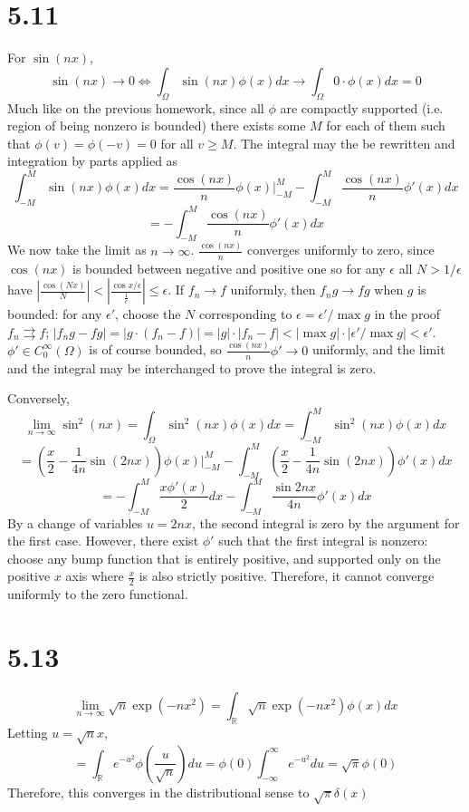 \documentclass{article}
\begin{document}
\section*{5.11}
For $\sin(nx)$,
\[\sin(nx)\to 0\Leftrightarrow\int_\Omega\sin(nx)\phi(x)dx\to \int_\Omega0\cdot\phi(x)dx=0\]
Much like on the previous homework, since all $\phi$ are compactly supported (i.e. region of being nonzero is bounded) there exists some $M$ for each of them such that $\phi(v)=\phi(-v)=0$ for all $v\geq M$. The integral may the be rewritten and integration by parts applied as
\[\int_{-M}^M\sin(nx)\phi(x)dx=\frac{\cos(nx)}{n}\phi(x)\bigg|_{-M}^M-\int_{-M}^M\frac{\cos(nx)}{n}\phi'(x)dx\]
\[=-\int_{-M}^M\frac{\cos(nx)}{n}\phi'(x)dx\]
We now take the limit as $n\to\infty$. $\frac{\cos(nx)}{n}$ converges uniformly to zero, since $\cos(nx)$ is bounded between negative and positive one so for any $\epsilon$ all $N> 1/\epsilon$ have $|\frac{\cos(Nx)}{N}|<|\frac{\cos{x/\epsilon}}{\frac{1}{\epsilon}}| \leq \epsilon$. If $f_n\to f$ uniformly, then $f_ng\to fg$ when $g$ is bounded: for any $\epsilon'$, choose the $N$ corresponding to $\epsilon= \epsilon' / \max{g}$ in the proof $f_n\rightrightarrows f$; $|f_ng-fg| =|g\cdot(f_n-f)| =|g|\cdot|f_n-f|< |\max{g}|\cdot|\epsilon'/\max g| < \epsilon '$. $\phi'\in C_0^\infty(\Omega)$ is of course bounded, so $\frac{\cos(nx)}{n}\phi'\to 0$ uniformly, and the limit and the integral may be interchanged to prove the integral is zero.

Conversely,
\[\lim_{n\to\infty}\sin^2(nx)=\int_\Omega \sin^2(nx)\phi(x)dx=\int_{-M}^M\sin^2(nx)\phi(x)dx\]
\[=\left( \frac{x}{2}-\frac{1}{4n}\sin(2nx)\right)\phi(x)\bigg|_{-M}^M-\int_{-M}^M\left( \frac{x}{2}-\frac{1}{4n}\sin(2nx) \right)\phi'(x)dx\]
\[=-\int_{-M}^M\frac{x\phi'(x)}{2}dx-\int_{-M}^M\frac{\sin{2nx}}{4n}\phi'(x)dx\]
By a change of variables $u=2nx$, the second integral is zero by the argument for the first case. However, there exist $\phi'$ such that the first integral is nonzero: choose any bump function that is entirely positive, and supported only on the positive $x$ axis where $\frac{x}{2}$ is also strictly positive. Therefore, it cannot converge uniformly to the zero functional.

\section*{5.13}

\[\lim_{n\to\infty}\sqrt{n}\exp(-nx^2)=\int_\mathbb{R}\sqrt{n}\exp(-nx^2)\phi(x)dx\]
Letting $u = \sqrt{n}x$,
\[=\int_\mathbb{R}e^{-u^2}\phi\left( \frac{u}{\sqrt{n}} \right)du=\phi(0)\int_{-\infty}^\infty e^{-u^2}du=\sqrt{\pi}\phi(0)\]
Therefore, this converges in the distributional sense to $\sqrt{\pi}\delta(x)$
\end{document}
